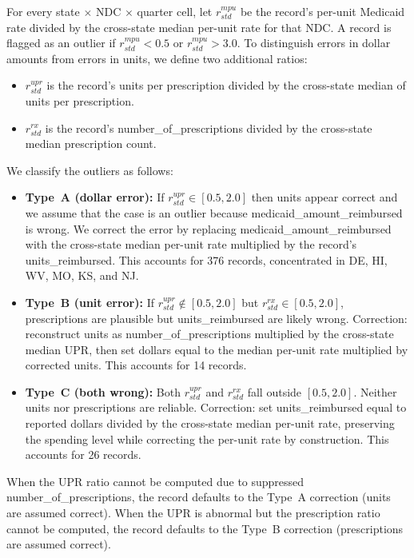 For every state $\times$ NDC $\times$ quarter cell, let $r_{std}^{mpu}$ be the record's per-unit Medicaid rate divided by the cross-state median per-unit rate for that NDC. A record is flagged as an outlier if $r_{std}^{mpu} < 0.5$ or $r_{std}^{mpu} > 3.0$.  To distinguish errors in dollar amounts from errors in units, we define two additional ratios:
%
\begin{itemize}
    \item $r_{std}^{upr}$ is the record's units per prescription divided by the cross-state median of units per prescription.
    \item $r_{std}^{rx}$ is the record's number\_of\_prescriptions divided by the cross-state median prescription count.
\end{itemize}
%
We classify the outliers as follows:
\begin{itemize}
    \item \textbf{Type~A (dollar error):} If $r_{std}^{upr} \in [0.5, 2.0]$ then units appear correct and we assume that the case is an outlier because medicaid\_amount\_reimbursed is wrong. We correct the error by replacing medicaid\_amount\_reimbursed with the cross-state median per-unit rate multiplied by the record's units\_reimbursed. This accounts for 376 records, concentrated in DE, HI, WV, MO, KS, and NJ.
    \item \textbf{Type~B (unit error):} If $r_{std}^{upr} \notin [0.5, 2.0]$ but $r_{std}^{rx} \in [0.5, 2.0]$, prescriptions are plausible but units\_reimbursed are likely wrong. Correction: reconstruct units as number\_of\_prescriptions multiplied by the cross-state median UPR, then set dollars equal to the median per-unit rate multiplied by corrected units. This accounts for 14 records.
    \item \textbf{Type~C (both wrong):} Both $r_{std}^{upr}$ and $r_{std}^{rx}$ fall outside $[0.5, 2.0]$. Neither units nor prescriptions are reliable. Correction: set units\_reimbursed equal to reported dollars divided by the cross-state median per-unit rate, preserving the spending level while correcting the per-unit rate by construction. This accounts for 26 records.
\end{itemize}
%
When the UPR ratio cannot be computed due to suppressed number\_of\_prescriptions, the record defaults to the Type~A correction (units are assumed correct). When the UPR is abnormal but the prescription ratio cannot be computed, the record defaults to the Type~B correction (prescriptions are assumed correct).


